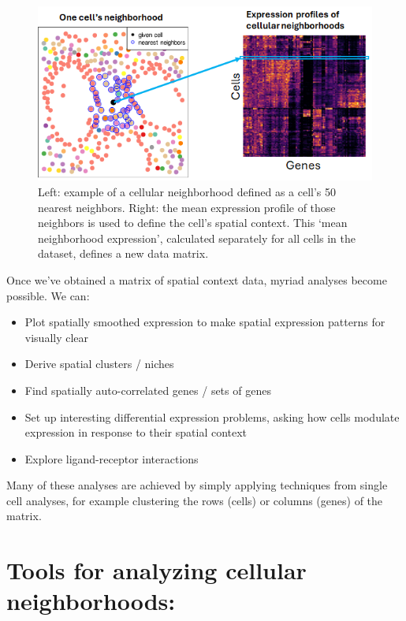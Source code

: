 \documentclass[
  letterpaper,
  DIV=11,
  numbers=noendperiod]{scrartcl}
\providecommand{\tightlist}{%
  \setlength{\itemsep}{0pt}\setlength{\parskip}{0pt}}\usepackage{longtable,booktabs,array}
\begin{document}
\begin{figure}

{\centering \includegraphics[width=1.2\textwidth,height=\textheight]{./figures/cartoon.png}

}

\caption{Left: example of a cellular neighborhood defined as a cell's 50
nearest neighbors. Right: the mean expression profile of those neighbors
is used to define the cell's spatial context. This `mean neighborhood
expression', calculated separately for all cells in the dataset, defines
a new data matrix.}

\end{figure}

Once we've obtained a matrix of spatial context data, myriad analyses
become possible. We can:

\begin{itemize}
\tightlist
\item
  Plot spatially smoothed expression to make spatial expression patterns
  for visually clear
\item
  Derive spatial clusters / niches
\item
  Find spatially auto-correlated genes / sets of genes
\item
  Set up interesting differential expression problems, asking how cells
  modulate expression in response to their spatial context
\item
  Explore ligand-receptor interactions
\end{itemize}

Many of these analyses are achieved by simply applying techniques from
single cell analyses, for example clustering the rows (cells) or columns
(genes) of the matrix.

\hypertarget{tools-for-analyzing-cellular-neighborhoods}{%
\section{Tools for analyzing cellular
neighborhoods:}\label{tools-for-analyzing-cellular-neighborhoods}}
\end{document}
